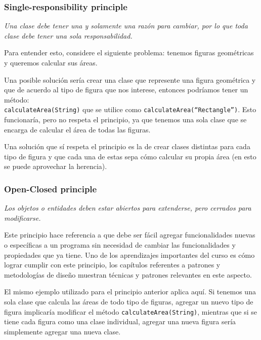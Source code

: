       \subsubsection{Single-responsibility principle}
        \textit{Una clase debe tener una y solamente una razón para cambiar, por lo que 
        toda clase debe tener una sola responsabilidad.}

        Para entender esto, considere el siguiente problema: tenemos figuras geométricas y 
        queremos calcular sus áreas.
        
        Una posible solución sería crear una clase que represente una figura geométrica y
        que de acuerdo al tipo de figura que nos interese, entonces podríamos tener un 
        método: \\
        \texttt{calculateArea(String)} que se utilice como 
        \texttt{calculateArea(``Rectangle'')}.
        Esto funcionaría, pero no respeta el principio, ya que tenemos una sola clase que
        se encarga de calcular el área de todas las figuras.

        Una solución que sí respeta el principio es la de crear clases distintas para cada 
        tipo de figura y que cada una de estas sepa cómo calcular su propia área (en esto 
        se puede aprovechar la herencia).

      \subsubsection{Open-Closed principle}
        \textit{Los objetos o entidades deben estar abiertos para extenderse, pero 
        cerrados para modificarse.}

        Este principio hace referencia a que debe ser fácil agregar funcionalidades nuevas
        o específicas a un programa sin necesidad de cambiar las funcionalidades y 
        propiedades que ya tiene.
        Uno de los aprendizajes importantes del curso es cómo lograr cumplir con este 
        principio, los capítulos referentes a patrones y metodologías de diseño muestran 
        técnicas y patrones relevantes en este aspecto.

        El mismo ejemplo utilizado para el principio anterior aplica aquí.
        Si tenemos una sola clase que calcula las áreas de todo tipo de figuras, agregar 
        un nuevo tipo de figura implicaría modificar el método 
        \texttt{calculateArea(String)}, mientras que si se tiene cada figura como una 
        clase individual, agregar una nueva figura sería simplemente agregar una nueva 
        clase.

